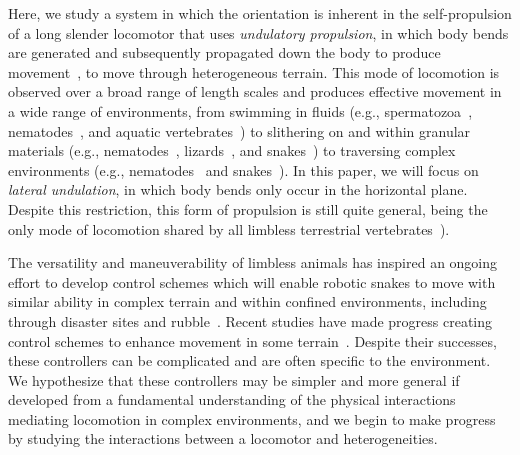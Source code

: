 \documentclass[aps,pre,twocolumn,superscriptaddress]{revtex4-1}
\begin{document}
Here, we study a system in which the orientation is inherent in the self-propulsion of a long slender locomotor that uses \emph{undulatory propulsion}, in which body bends are generated and subsequently propagated down the body to produce movement~\cite{gray1953undulatory}, to move through heterogeneous terrain. This mode of locomotion is observed over a broad range of length scales and produces effective movement in a wide range of environments, from swimming in fluids (e.g., spermatozoa~\cite{gray1955propulsion}, nematodes~\cite{gray1964locomotion}, and aquatic vertebrates~\cite{sfakiotakis1999review,gillis1996undulatory}) to slithering on and within granular materials (e.g., nematodes~\cite{juarez2010motility}, lizards~\cite{maladen2009undulatory}, and snakes~\cite{sharpe2015locomotor}) to traversing complex environments (e.g., nematodes~\cite{lockery2008artificial,park2008enhanced,majmudar2012experiments} and snakes~\cite{gray1950kinetics,kelley1997effects}). In this paper, we will focus on \emph{lateral undulation}, in which body bends only occur in the horizontal plane. Despite this restriction, this form of propulsion is still quite general, being the only mode of locomotion shared by all limbless terrestrial vertebrates~\cite{gans1975tetrapod}).

The versatility and maneuverability of limbless animals has inspired an ongoing effort to develop control schemes which will enable robotic snakes to move with similar ability in complex terrain and within confined environments, including through disaster sites and rubble~\cite{Murphy2008}. Recent studies have made progress creating control schemes to enhance movement in some terrain~\cite{transeth2008snake,Liljeback:2010eb,Liljeback:2010tg,travers2016shape}.  Despite their successes,  these controllers can be complicated and are often specific to the environment.  We hypothesize that these controllers may be simpler and more general if developed from a fundamental understanding of the physical interactions mediating locomotion in complex environments, and we begin to make progress by studying the interactions between a locomotor and heterogeneities.
\end{document}
